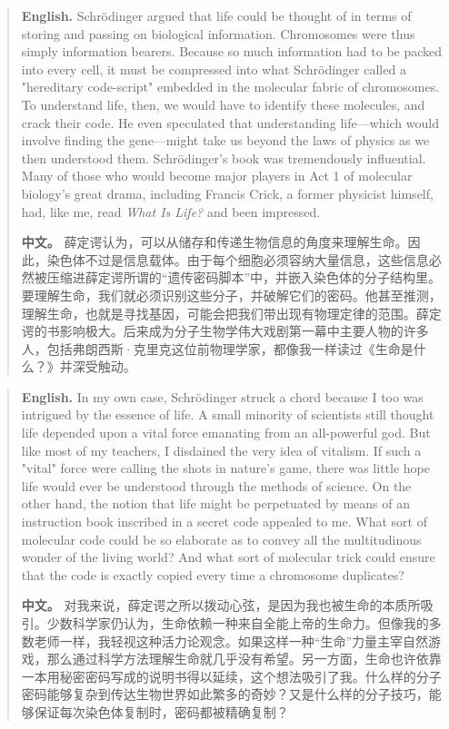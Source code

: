 \begin{quote}
\noindent\textbf{English.} Schrödinger argued that life could be thought of in terms of storing and passing on biological information. Chromosomes were thus simply information bearers. Because so much information had to be packed into every cell, it must be compressed into what Schrödinger called a "hereditary code-script" embedded in the molecular fabric of chromosomes. To understand life, then, we would have to identify these molecules, and crack their code. He even speculated that understanding life---which would involve finding the gene---might take us beyond the laws of physics as we then understood them. Schrödinger's book was tremendously influential. Many of those who would become major players in Act 1 of molecular biology's great drama, including Francis Crick, a former physicist himself, had, like me, read \emph{What Is Life?} and been impressed.

\smallskip
\noindent\textbf{中文。} 薛定谔认为，可以从储存和传递生物信息的角度来理解生命。因此，染色体不过是信息载体。由于每个细胞必须容纳大量信息，这些信息必然被压缩进薛定谔所谓的“遗传密码脚本”中，并嵌入染色体的分子结构里。要理解生命，我们就必须识别这些分子，并破解它们的密码。他甚至推测，理解生命，也就是寻找基因，可能会把我们带出现有物理定律的范围。薛定谔的书影响极大。后来成为分子生物学伟大戏剧第一幕中主要人物的许多人，包括弗朗西斯·克里克这位前物理学家，都像我一样读过《生命是什么？》并深受触动。
\end{quote}

\begin{quote}
\noindent\textbf{English.} In my own case, Schrödinger struck a chord because I too was intrigued by the essence of life. A small minority of scientists still thought life depended upon a vital force emanating from an all-powerful god. But like most of my teachers, I disdained the very idea of vitalism. If such a "vital" force were calling the shots in nature's game, there was little hope life would ever be understood through the methods of science. On the other hand, the notion that life might be perpetuated by means of an instruction book inscribed in a secret code appealed to me. What sort of molecular code could be so elaborate as to convey all the multitudinous wonder of the living world? And what sort of molecular trick could ensure that the code is exactly copied every time a chromosome duplicates?

\smallskip
\noindent\textbf{中文。} 对我来说，薛定谔之所以拨动心弦，是因为我也被生命的本质所吸引。少数科学家仍认为，生命依赖一种来自全能上帝的生命力。但像我的多数老师一样，我轻视这种活力论观念。如果这样一种“生命”力量主宰自然游戏，那么通过科学方法理解生命就几乎没有希望。另一方面，生命也许依靠一本用秘密密码写成的说明书得以延续，这个想法吸引了我。什么样的分子密码能够复杂到传达生物世界如此繁多的奇妙？又是什么样的分子技巧，能够保证每次染色体复制时，密码都被精确复制？
\end{quote}

